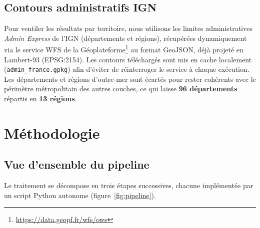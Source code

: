 \documentclass[11pt,a4paper]{article}
\begin{document}
\subsection{Contours administratifs IGN}

Pour ventiler les résultats par territoire, nous utilisons les limites administratives \emph{Admin Express} de l'IGN (départements et régions), récupérées dynamiquement via le service WFS de la Géoplateforme\footnote{\url{https://data.geopf.fr/wfs/ows}} au format GeoJSON, déjà projeté en Lambert-93 (EPSG:2154). Les contours téléchargés sont mis en cache localement (\texttt{admin\_france.gpkg}) afin d'éviter de réinterroger le service à chaque exécution. Les départements et régions d'outre-mer sont écartés pour rester cohérents avec le périmètre métropolitain des autres couches, ce qui laisse \textbf{96 départements} répartis en \textbf{13 régions}.

\section{Méthodologie}

\subsection{Vue d'ensemble du pipeline}

Le traitement se décompose en trois étapes successives, chacune implémentée par un script Python autonome (figure~\ref{fig:pipeline}).
\end{document}
